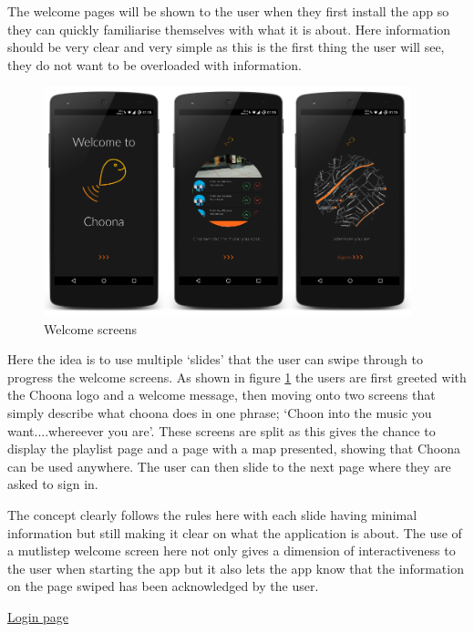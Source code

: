 The welcome pages will be shown to the user when they first install the app so they can quickly familiarise themselves with what it is about. Here information should be very clear and very simple as this is the first thing the user will see, they do not want to be overloaded with information. \\

\noindent
\begin{figure}[h!]
\centering
\includegraphics[width=0.95\textwidth]{./img/welcomeframed.png}
\caption{Welcome screens}
\label{fig:welcomescreens}
\end{figure}

Here the idea is to use multiple `slides' that the user can swipe through to progress the welcome screens. As shown in figure \ref{fig:welcomescreens} the users are first greeted with the Choona logo and a welcome message, then moving onto two screens that simply describe what choona does in one phrase; `Choon into the music you want....whereever you are'. These screens are split as this gives the chance to display the playlist page and a page with a map presented, showing that Choona can be used anywhere. The user can then slide to the next page where they are asked to sign in. 

The concept clearly follows the rules here with each slide having minimal information but still making it clear on what the application is about. The use of a mutlistep welcome screen here not only gives a dimension of interactiveness to the user when starting the app but it also lets the app know that the information on the page swiped has been acknowledged by the user.  

\clearpage

\noindent\underline{Login page}\newline

